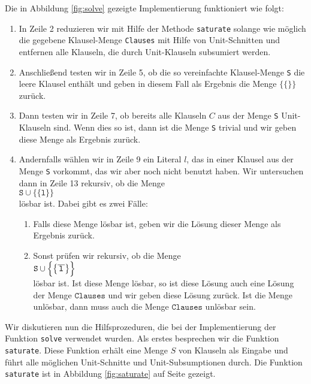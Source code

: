 Die in Abbildung \ref{fig:solve} gezeigte Implementierung funktioniert wie folgt:
\begin{enumerate}
\item In Zeile 2 reduzieren wir mit Hilfe der Methode \texttt{saturate} 
      solange wie möglich die gegebene Klausel-Menge \texttt{Clauses} mit Hilfe
      von Unit-Schnitten und entfernen alle Klauseln, die durch Unit-Klauseln
      subsumiert werden.
\item Anschließend testen wir in Zeile 5, ob die so vereinfachte Klausel-Menge \texttt{S}
      die leere Klausel enthält und geben in diesem Fall als Ergebnis die Menge 
      $\bigl\{\{\}\bigr\}$ zurück.
\item Dann testen wir in Zeile 7, ob bereits alle Klauseln $C$ aus der Menge
      \texttt{S} Unit-Klauseln sind.  Wenn dies so ist,
      dann ist die Menge \texttt{S} trivial und wir geben diese Menge als Ergebnis zurück.
\item Andernfalls wählen wir in Zeile 9 ein Literal $l$, das in einer Klausel aus der Menge \texttt{S} vorkommt, 
      das wir aber noch nicht benutzt haben.
      Wir untersuchen dann in Zeile 13 rekursiv, ob die Menge \\[0.2cm]
      \hspace*{1.3cm} 
      $\texttt{S} \cup \bigl\{\{\texttt{l}\}\bigr\}$ 
      \\[0.2cm]
      lösbar ist.  Dabei gibt es zwei Fälle:
      \begin{enumerate}
      \item Falls diese Menge lösbar ist, geben wir die Lösung dieser Menge als Ergebnis zurück.

      \item Sonst prüfen wir rekursiv, ob die Menge 
            \\[0.2cm]
            \hspace*{1.3cm}
            $\texttt{S} \cup \Bigl\{ \bigl\{ \overline{\,\texttt{l}\,} \bigr\} \Bigr\}$ 
            \\[0.2cm]
            lösbar ist.  Ist diese Menge lösbar, so ist diese Lösung auch eine
            Lösung der Menge $\texttt{Clauses}$ und wir geben diese Lösung zurück.  Ist die
            Menge unlösbar, dann muss auch die Menge $\texttt{Clauses}$ unlösbar sein.
      \end{enumerate}
\end{enumerate}

Wir diskutieren nun die Hilfsprozeduren, die bei der Implementierung der Funktion
\texttt{solve} verwendet wurden.
Als erstes besprechen wir die Funktion \texttt{saturate}.  Diese Funktion erhält eine
Menge $S$ von Klauseln als Eingabe und führt alle möglichen Unit-Schnitte und
Unit-Subsumptionen durch.  
Die Funktion \texttt{saturate} ist in Abbildung \ref{fig:saturate} auf Seite \pageref{fig:saturate}
gezeigt.

